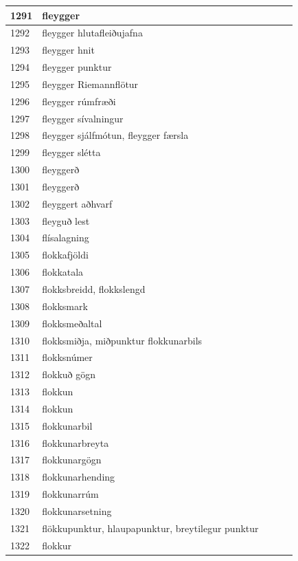 \begin{longtable}{p{}|p{}|p{}|p{}|p{}}
\hline
1291 & fleygger &  &  &  \\
\hline
1292 & fleygger hlutafleiðujafna &  &  &  \\
\hline
1293 & fleygger hnit &  &  &  \\
\hline
1294 & fleygger punktur &  &  &  \\
\hline
1295 & fleygger Riemannflötur &  &  &  \\
\hline
1296 & fleygger rúmfræði &  &  &  \\
\hline
1297 & fleygger sívalningur &  &  &  \\
\hline
1298 & fleygger sjálfmótun, fleygger færsla &  &  &  \\
\hline
1299 & fleygger slétta &  &  &  \\
\hline
1300 & fleyggerð &  &  &  \\
\hline
1301 & fleyggerð &  &  &  \\
\hline
1302 & fleyggert aðhvarf &  &  &  \\
\hline
1303 & fleyguð lest &  &  &  \\
\hline
1304 & flísalagning &  &  &  \\
\hline
1305 & flokkafjöldi &  &  &  \\
\hline
1306 & flokkatala &  &  &  \\
\hline
1307 & flokksbreidd, flokkslengd &  &  &  \\
\hline
1308 & flokksmark &  &  &  \\
\hline
1309 & flokksmeðaltal &  &  &  \\
\hline
1310 & flokksmiðja, miðpunktur flokkunarbils &  &  &  \\
\hline
1311 & flokksnúmer &  &  &  \\
\hline
1312 & flokkuð gögn &  &  &  \\
\hline
1313 & flokkun &  &  &  \\
\hline
1314 & flokkun &  &  &  \\
\hline
1315 & flokkunarbil &  &  &  \\
\hline
1316 & flokkunarbreyta &  &  &  \\
\hline
1317 & flokkunargögn &  &  &  \\
\hline
1318 & flokkunarhending &  &  &  \\
\hline
1319 & flokkunarrúm &  &  &  \\
\hline
1320 & flokkunarsetning &  &  &  \\
\hline
1321 & flökkupunktur, hlaupapunktur, breytilegur punktur &  &  &  \\
\hline
1322 & flokkur &  &  &  \\

\end{longtable}
